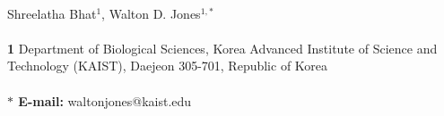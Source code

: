 \begin{flushleft}
\\
Shreelatha Bhat$^{1}$, 
Walton D. Jones$^{1,\ast}$
\\
\\
{\bf 1} Department of Biological Sciences, Korea Advanced Institute of Science and Technology (KAIST), Daejeon 305-701, Republic of Korea
\\
\\
{\bf $\ast$ E-mail:} waltonjones@kaist.edu
\end{flushleft}